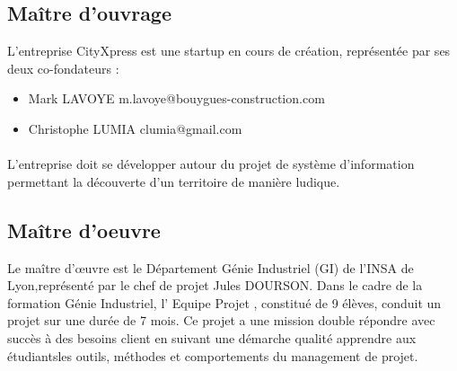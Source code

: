 \subsection{Maître d'ouvrage} 
L'entreprise CityXpress est une startup en cours de création, représentée par ses deux co-fondateurs :
\begin{itemize}
	\item Mark LAVOYE	m.lavoye@bouygues-construction.com
	\item Christophe LUMIA	clumia@gmail.com 
\end{itemize}
\paragraph{}
L’entreprise doit se développer autour du projet de système d’information permettant la découverte d’un territoire de manière ludique.

\subsection{Maître d'oeuvre} 
Le maître d’œuvre est le Département Génie Industriel (GI) de l’INSA de Lyon,représenté par le chef de projet Jules DOURSON.
Dans le cadre de la formation Génie Industriel, l'  Equipe Projet , constitué de 9 élèves, conduit un projet sur une durée de 7 mois. 
Ce projet a une mission double 
répondre avec succès à des besoins client en suivant une démarche qualité  
apprendre aux étudiantsles outils, méthodes et comportements du management de projet.

